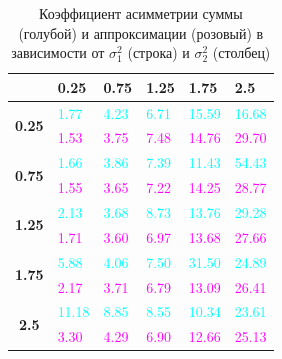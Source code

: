 \documentclass[12pt]{article}
\begin{document}
\begin{table}[!hhh]
	\centering
	\caption{Коэффициент асимметрии суммы (голубой) и аппроксимации (розовый) в зависимости от $\sigma_{1}^{2}$ (строка) и $\sigma_{2}^{2}$ (столбец) }
	\begin{tabular}{|c|l|l|l|l|l|}
		\hline
		& \textbf{0.25} & \textbf{0.75} & \textbf{1.25} & \textbf{1.75} & \textbf{2.5} \\ \hline
		\multirow{2}{*}{\textbf{0.25}} & \textcolor{cyan}{1.77}          & \textcolor{cyan}{4.23}          & \textcolor{cyan}{6.71}          & \textcolor{cyan}{15.59}         & \textcolor{cyan}{16.68}        \\ \cline{2-6} 
		& \textcolor{magenta}{1.53}          & \textcolor{magenta}{3.75}          & \textcolor{magenta}{7.48}          & \textcolor{magenta}{14.76}         & \textcolor{magenta}{29.70}        \\ \hline
		\multirow{2}{*}{\textbf{0.75}} & \textcolor{cyan}{1.66}          & \textcolor{cyan}{3.86}          & \textcolor{cyan}{7.39}          & \textcolor{cyan}{11.43}         & \textcolor{cyan}{54.43}        \\ \cline{2-6} 
		& \textcolor{magenta}{1.55}          & \textcolor{magenta}{3.65}          & \textcolor{magenta}{7.22}          & \textcolor{magenta}{14.25}         & \textcolor{magenta}{28.77}        \\ \hline
		\multirow{2}{*}{\textbf{1.25}} & \textcolor{cyan}{2.13}          & \textcolor{cyan}{3.68}          & \textcolor{cyan}{8.73}          & \textcolor{cyan}{13.76}         & \textcolor{cyan}{29.28}        \\ \cline{2-6} 
		& \textcolor{magenta}{1.71}          & \textcolor{magenta}{3.60}          & \textcolor{magenta}{6.97}          & \textcolor{magenta}{13.68}         & \textcolor{magenta}{27.66}        \\ \hline
		\multirow{2}{*}{\textbf{1.75}} & \textcolor{cyan}{5.88}          & \textcolor{cyan}{4.06}          & \textcolor{cyan}{7.50}          & \textcolor{cyan}{31.50}         & \textcolor{cyan}{24.89}        \\ \cline{2-6} 
		& \textcolor{magenta}{2.17}          & \textcolor{magenta}{3.71}          & \textcolor{magenta}{6.79}          & \textcolor{magenta}{13.09}         & \textcolor{magenta}{26.41}        \\ \hline
		\multirow{2}{*}{\textbf{2.5}}  & \textcolor{cyan}{11.18}         & \textcolor{cyan}{8.85}          & \textcolor{cyan}{8.55}          & \textcolor{cyan}{10.34}         & \textcolor{cyan}{23.61}        \\ \cline{2-6} 
		& \textcolor{magenta}{3.30}          & \textcolor{magenta}{4.29}          & \textcolor{magenta}{6.90}          & \textcolor{magenta}{12.66}         & \textcolor{magenta}{25.13}        \\ \hline
	\end{tabular}
\end{table}
\end{document}
